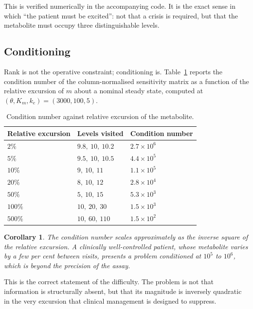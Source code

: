 \documentclass[11pt,a4paper]{article}
\newtheorem{corollary}{Corollary}
\begin{document}
This is verified numerically in the accompanying code. It is the exact sense in which
``the patient must be excited'': not that a crisis is required, but that the metabolite
must occupy three distinguishable levels.

\subsection{Conditioning}
\label{sec:cond}

Rank is not the operative constraint; conditioning is. Table~\ref{tab:cond} reports the
condition number of the column-normalised sensitivity matrix as a function of the relative
excursion of $m$ about a nominal steady state, computed at
$(\theta, K_m, k_e) = (3000, 100, 5)$.

\begin{table}[htbp]
\centering
\small
\caption{Condition number against relative excursion of the metabolite.}
\label{tab:cond}
\begin{tabular}{@{}lll@{}}
\toprule
\textbf{Relative excursion} & \textbf{Levels visited} & \textbf{Condition number} \\
\midrule
$2\%$   & $9.8,\ 10,\ 10.2$   & $2.7 \times 10^{6}$ \\
$5\%$   & $9.5,\ 10,\ 10.5$   & $4.4 \times 10^{5}$ \\
$10\%$  & $9,\ 10,\ 11$       & $1.1 \times 10^{5}$ \\
$20\%$  & $8,\ 10,\ 12$       & $2.8 \times 10^{4}$ \\
$50\%$  & $5,\ 10,\ 15$       & $5.3 \times 10^{3}$ \\
$100\%$ & $10,\ 20,\ 30$      & $1.5 \times 10^{3}$ \\
$500\%$ & $10,\ 60,\ 110$     & $1.5 \times 10^{2}$ \\
\bottomrule
\end{tabular}
\end{table}

\begin{corollary}
The condition number scales approximately as the inverse square of the relative excursion.
A clinically well-controlled patient, whose metabolite varies by a few per cent between
visits, presents a problem conditioned at $10^{5}$ to $10^{6}$, which is beyond the
precision of the assay.
\end{corollary}

This is the correct statement of the difficulty. The problem is not that information is
structurally absent, but that its magnitude is inversely quadratic in the very excursion
that clinical management is designed to suppress.
\end{document}
